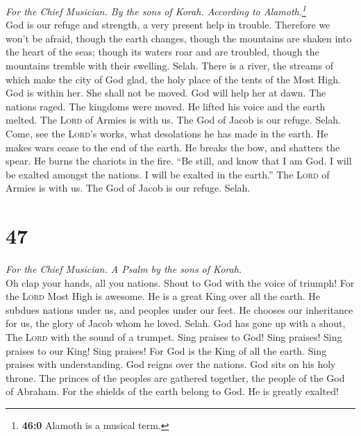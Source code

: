 \emph{For the Chief Musician. By the sons of Korah. According to
Alamoth.\footnote{\textbf{46:0} Alamoth is a musical term.}}\\
 God is our refuge and strength, a very present help in
trouble.  Therefore we won't be afraid, though the earth
changes, though the mountains are shaken into the heart of the seas;
 though its waters roar and are troubled, though the
mountains tremble with their swelling. Selah.  There is a
river, the streams of which make the city of God glad, the holy place of
the tents of the Most High.  God is within her. She shall
not be moved. God will help her at dawn.  The nations
raged. The kingdoms were moved. He lifted his voice and the earth
melted.  The \textsc{Lord} of Armies is with us. The God
of Jacob is our refuge. Selah.  Come, see the
\textsc{Lord}'s works, what desolations he has made in the earth.
 He makes wars cease to the end of the earth. He breaks
the bow, and shatters the spear. He burns the chariots in the fire.
 ``Be still, and know that I am God. I will be exalted
amongst the nations. I will be exalted in the earth.'' 
The \textsc{Lord} of Armies is with us. The God of Jacob is our refuge.
Selah.

\hypertarget{section-46}{%
\section{47}\label{section-46}}

\emph{For the Chief Musician. A Psalm by the sons of Korah.}\\
 Oh clap your hands, all you nations. Shout to God with
the voice of triumph!  For the \textsc{Lord} Most High is
awesome. He is a great King over all the earth.  He
subdues nations under us, and peoples under our feet.  He
chooses our inheritance for us, the glory of Jacob whom he loved. Selah.
 God has gone up with a shout, The \textsc{Lord} with the
sound of a trumpet.  Sing praises to God! Sing praises!
Sing praises to our King! Sing praises!  For God is the
King of all the earth. Sing praises with understanding. 
God reigns over the nations. God sits on his holy throne. 
The princes of the peoples are gathered together, the people of the God
of Abraham. For the shields of the earth belong to God. He is greatly
exalted!

